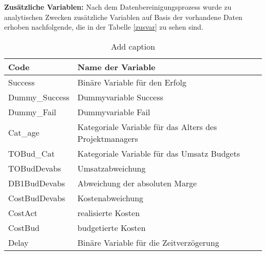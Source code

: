 \newline\newline
\textbf{Zusätzliche Variablen:} Nach dem Datenbereinigungsprozess wurde zu analytischen Zwecken zusätzliche Variablen auf Basis der vorhandene Daten erhoben nachfolgende, die in der Tabelle \ref{zusvar} zu sehen sind.
\begin{table}[htbp]
	\centering
	\caption{Add caption}
	\begin{tabular}{ll}
		\toprule
		\textbf{Code} & \textbf{Name der Variable} \\
		\midrule
		Success & Binäre Variable für den Erfolg \\
		Dummy\_Success & Dummyvariable Success \\
		Dummy\_Fail & Dummyvariable Fail \\
		Cat\_age & Kategoriale Variable für das Alters des Projektmanagers \\
		TOBud\_Cat & Kategoriale Variable für das Umsatz Budgets \\
		TOBudDevabs & Umsatzabweichung \\
		DB1BudDevabs & Abweichung der absoluten Marge \\
		CostBudDevabs & Kostenabweichung \\
		CostAct & realisierte Kosten \\
		CostBud & budgetierte Kosten \\
		Delay & Binäre Variable für die Zeitverzögerung \\
		\bottomrule
	\end{tabular}%
	\label{tab:zusvar}%
\end{table}%




